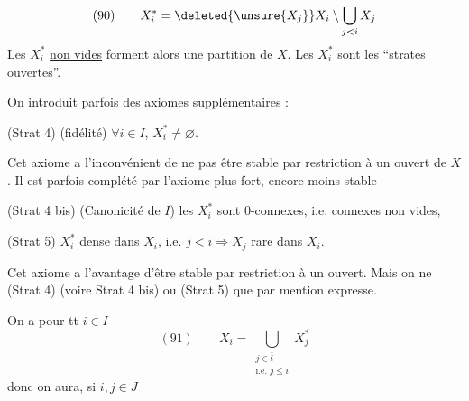 
\[(90)\qquad X_i^*=\deleted{\unsure{X_j}}X_i\setminus\bigcup_{j<i}X_j\]
Les $X_i^*$ \uline{non vides} forment alors une partition de $X$. Les $X_i^*$ sont les ``strates ouvertes''.

On introduit parfois des axiomes supplémentaires :

(Strat 4) (fidélité) $\forall i\in I$, $X_i^*\neq\varnothing$.

Cet axiome a l'inconvénient de ne pas être stable par  restriction à un ouvert de $X$. Il est parfois complété par l'axiome plus fort, encore moins stable

(Strat 4 bis) (Canonicité de $I$) les $X_i^*$ sont $0$-connexes, i.e. connexes non vides,

(Strat 5)  $X_i^*$ dense dans $X_i$,  i.e. $j<i\Rightarrow X_j$ \uline{rare} dans $X_i$.

Cet axiome a l'avantage d'être stable par restriction à un ouvert. Mais on ne  (Strat 4) (voire Strat 4 bis) ou (Strat 5) que par mention expresse.

On a pour tt $i\in I$
\[
(91)\qquad X_i=\bigcup_{\substack{j\in\bar i\\\text{i.e. }j\leq i}}X_j^*
\]
donc on aura, si $i,j\in J$
